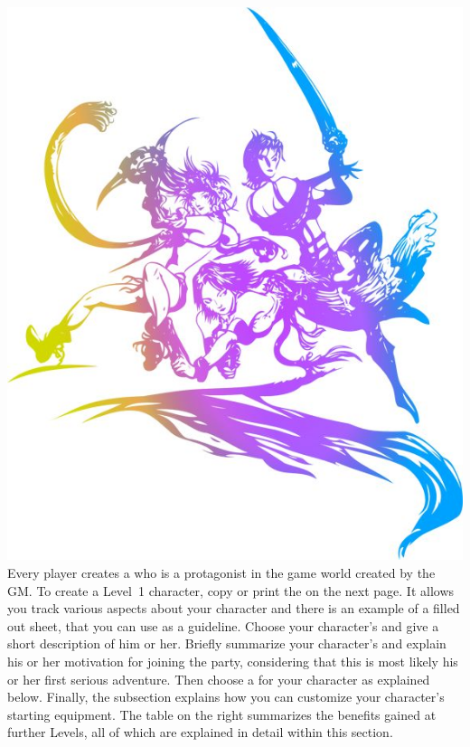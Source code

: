 %
\\\\
%
\includegraphics[width=\columnwidth]{./art/images/ff10-2.jpg}
%
\vfill
%
Every player creates a  who is a protagonist in the game world created by the GM.
To create a Level~1 character, copy or print the  on the next page.
It allows you track various aspects about your character and there is an example of a filled out sheet, that you can use as a guideline.
Choose your character's  and give a short description of him or her.
Briefly summarize your character's  and explain his or her motivation for joining the party, considering that this is most likely his or her first serious adventure.
Then choose a  for your character as explained below. 
Finally, the  subsection explains how you can customize your character's starting equipment.
The table on the right summarizes the benefits gained at further Levels, all of which are explained in detail within this section.

